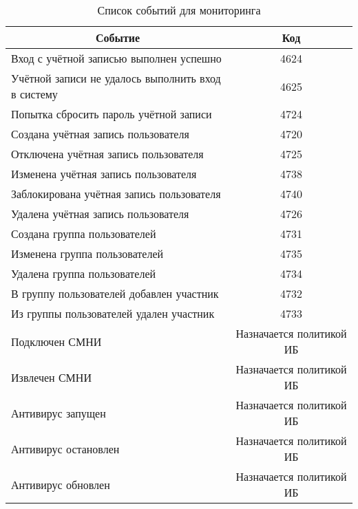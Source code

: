 \begin{table}[H]
	\centering
	\caption{Список событий для мониторинга}
	\begin{tabular}{|l|c|}
		\hline
		\multicolumn{1}{|c|}{Событие}                      & \multicolumn{1}{c|}{Код} \\ \hline
		Вход с учётной записью выполнен успешно            & 4624                     \\ \hline
		Учётной записи не удалось выполнить вход в систему & 4625                     \\ \hline
		Попытка сбросить пароль учётной записи             & 4724                     \\ \hline
		Создана учётная запись пользователя                & 4720                     \\ \hline
		Отключена учётная запись пользователя              & 4725                     \\ \hline
		Изменена учётная запись пользователя               & 4738                     \\ \hline
		Заблокирована учётная запись пользователя          & 4740                     \\ \hline
		Удалена учётная запись пользователя                & 4726                     \\ \hline
		Создана группа пользователей                       & 4731                     \\ \hline
		Изменена группа пользователей                      & 4735                     \\ \hline
		Удалена группа пользователей                       & 4734                     \\ \hline
		В группу пользователей добавлен участник           & 4732                     \\ \hline
		Из группы пользователей удален участник            & 4733                     \\ \hline
		Подключен СМНИ            &    Назначается политикой ИБ                  \\ \hline		
		Извлечен СМНИ            &   Назначается политикой ИБ                   \\ \hline				
		Антивирус запущен            &   Назначается политикой ИБ                   \\ \hline		
		Антивирус остановлен            & Назначается политикой ИБ                      \\ \hline				
		Антивирус обновлен            & Назначается политикой ИБ                      \\ \hline						
	\end{tabular}
\end{table}


